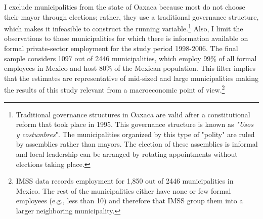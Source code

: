 \documentclass[dv_diss_main.tex]{subfiles}
\begin{document}
I exclude municipalities from the state of Oaxaca because most do not choose their mayor through elections; rather, they use a traditional governance structure, which makes it infeasible to construct the running variable.\footnote{Traditional governance structures in Oaxaca are valid after a constitutional reform that took place in 1995. This governance structure is known as \textit{"Usos y costumbres}". The municipalities organized by this type of "polity" are ruled by assemblies rather
than mayors. The election of these assemblies is informal and local leadership
can be arranged by rotating appointments without elections taking place.} Also, I limit the observations to those municipalities for which there is information available on formal private-sector employment for the study period 1998-2006. The final sample considers 1097 out of 2446 municipalities, which employ 99\% of all formal employees in Mexico and host 80\% of the Mexican population. This filter implies that the estimates are representative of mid-sized and large municipalities making the results of this study relevant from a macroeconomic point of view.\footnote{IMSS data records employment for 1,850 out of 2446 municipalities in Mexico. The rest of the municipalities either have none or few formal employees (e.g., less than 10) and therefore that IMSS group them into a larger neighboring municipality.}
\end{document}
